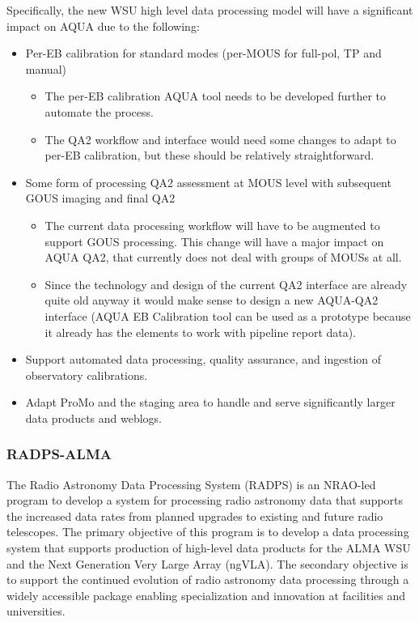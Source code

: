 Specifically, the new WSU high level data processing model will have a significant impact on AQUA due to the following:
\begin{itemize}[itemsep=-0.5em]
    \item Per-EB calibration for standard modes (per-MOUS for full-pol, TP and manual)
    \begin{itemize}[itemsep=-0.5em]
        \item The per-EB calibration AQUA tool needs to be developed further to automate the process.
        \item The QA2 workflow and interface would need some changes to adapt to per-EB calibration, but these should be relatively straightforward.
    \end{itemize}
    \item Some form of processing QA2 assessment at MOUS level with subsequent GOUS imaging and final QA2
    \begin{itemize}[itemsep=-0.5em]
        \item The current data processing workflow will have to be augmented to support GOUS processing. This change will have a major impact on AQUA QA2, that currently does not deal with groups of MOUSs at all.
        \item Since the technology and design of the current QA2 interface are already quite old anyway it would make sense to design a new AQUA-QA2 interface (AQUA EB Calibration tool can be used as a prototype because it already has the elements to work with pipeline report data).
    \end{itemize}
    \item Support automated data processing, quality assurance, and ingestion of observatory calibrations.
    \item Adapt ProMo and the staging area to handle and serve significantly larger data products and weblogs.
\end{itemize}


\subsubsection{RADPS-ALMA}
\label{sec:radps-alma}
The Radio Astronomy Data Processing System (RADPS) is an NRAO-led program to develop a system for processing radio astronomy data that supports the increased data rates from planned upgrades to existing and future radio telescopes. The primary objective of this program is to develop a data processing system that supports production of high-level data products for the ALMA WSU and the Next  Generation Very Large Array (ngVLA). The secondary objective is to support the continued evolution of radio astronomy data processing through a widely accessible package enabling specialization and innovation at facilities and universities.  


